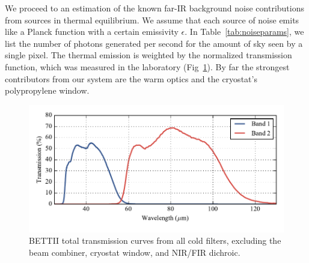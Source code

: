 We proceed to an estimation of the known far-IR background noise contributions from sources in thermal equilibrium. We assume that each source of noise emits like a Planck function \Bnu with a certain emissivity $\epsilon$. In Table~\ref{tab:noiseparams}, we list the number of photons generated per second for the amount of sky seen by a single pixel. The thermal emission is weighted by the normalized transmission function, which was measured in the laboratory (Fig~\ref{fig:BETTIITransmission}). By far the strongest contributors from our system are the warm optics and the cryostat's polypropylene window. 
\begin{figure}[!h]
	\centering
	\includegraphics[width=\textwidth]{Figures/BETTII_transmission.pdf}
	\caption[BETTII Transmission curves]{BETTII total transmission curves from all cold filters, excluding the beam combiner, cryostat window, and NIR/FIR dichroic.}
	\label{fig:BETTIITransmission}
    \end{figure}

